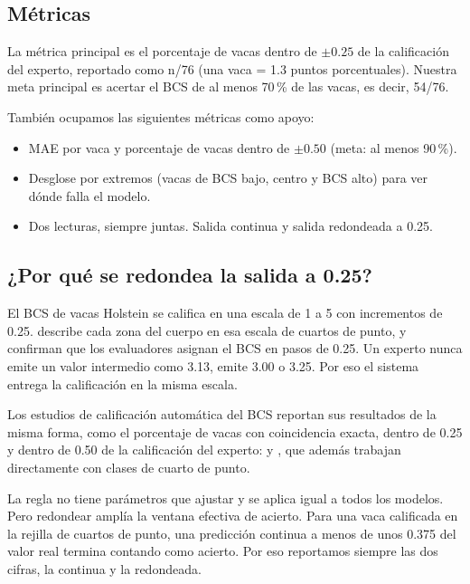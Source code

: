 \subsection{Métricas}

La métrica principal es el porcentaje de vacas dentro de $\pm0.25$ de la calificación del experto, reportado como n/76 (una vaca = 1.3 puntos porcentuales). Nuestra meta principal es acertar el BCS de al menos 70\,\% de las vacas, es decir, 54/76.

También ocupamos las siguientes métricas como apoyo:

\begin{itemize}
  \item MAE por vaca y porcentaje de vacas dentro de $\pm0.50$ (meta: al menos 90\,\%).
  \item Desglose por extremos (vacas de BCS bajo, centro y BCS alto) para ver dónde falla el modelo.
  \item Dos lecturas, siempre juntas. Salida continua y salida redondeada a 0.25.
\end{itemize}

\subsection{¿Por qué se redondea la salida a 0.25?}

El BCS de vacas Holstein se califica en una escala de 1 a 5 con incrementos de 0.25. \textcite{edmonson1989} describe cada zona del cuerpo en esa escala de cuartos de punto, y \textcite{ferguson1994} confirman que los evaluadores asignan el BCS en pasos de 0.25. Un experto nunca emite un valor intermedio como 3.13, emite 3.00 o 3.25. Por eso el sistema entrega la calificación en la misma escala.

Los estudios de calificación automática del BCS reportan sus resultados de la misma forma, como el porcentaje de vacas con coincidencia exacta, dentro de 0.25 y dentro de 0.50 de la calificación del experto: \textcite{yukun2019} y \textcite{nagy2023}, que además trabajan directamente con clases de cuarto de punto.

La regla no tiene parámetros que ajustar y se aplica igual a todos los modelos. Pero redondear amplía la ventana efectiva de acierto. Para una vaca calificada en la rejilla de cuartos de punto, una predicción continua a menos de unos 0.375 del valor real termina contando como acierto. Por eso reportamos siempre las dos cifras, la continua y la redondeada.
